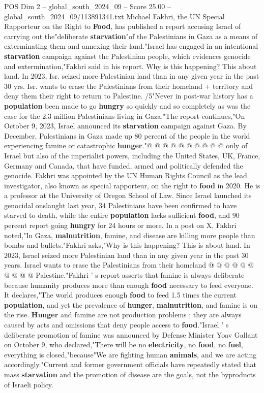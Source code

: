 \begin{textsample}{POS Dim 2 – global\_south\_2024\_09 – Score 25.00 – global\_south\_2024\_09/113891341.txt}  \label{ex:f2_pos_194}
Michael Fakhri, the UN Special Rapporteur on the Right to \textbf{Food}, has published a report accusing Israel of carrying out the"deliberate \textbf{starvation}"of the Palestinians in Gaza as a means of exterminating them and annexing their land."Israel has engaged in an intentional \textbf{starvation} campaign against the Palestinian people, which evidences genocide and extermination,"Fakhri said in his report.
Why is this happening?
This about land.
In 2023, Isr. seized more Palestinian land than in any given year in the past 30 yrs.
Isr. wants to erase the Palestinians from their homeland + territory and deny them their right to return to Palestine. /5"Never in post-war history has a \textbf{population} been made to go \textbf{hungry} so quickly and so completely as was the case for the 2.3 million Palestinians living in Gaza."The report continues,"On October 9, 2023, Israel announced its \textbf{starvation} campaign against Gaza.
By December, Palestinians in Gaza made up 80 percent of the people in the world experiencing famine or catastrophic \textbf{hunger}."@ @ @ @ @ @ @ @ @ @ only of Israel but also of the imperialist powers, including the United States, UK, France, Germany and Canada, that have funded, armed and politically defended the genocide.
Fakhri was appointed by the UN Human Rights Council as the lead investigator, also known as special rapporteur, on the right to \textbf{food} in 2020.
He is a professor at the University of Oregon School of Law.
Since Israel launched its genocidal onslaught last year, 34 Palestinians have been confirmed to have starved to death, while the entire \textbf{population} lacks sufficient \textbf{food}, and 90 percent report going \textbf{hungry} for 24 hours or more.
In a post on X, Fakhri noted,"In Gaza, \textbf{malnutrition}, famine, and disease are killing more people than bombs and bullets."Fakhri asks,"Why is this happening?
This is about land.
In 2023, Israel seized more Palestinian land than in any given year in the past 30 years.
Israel wants to erase the Palestinians from their homeland @ @ @ @ @ @ @ @ @ @ Palestine."Fakhri ' s report asserts that famine is always deliberate because humanity produces more than enough \textbf{food} necessary to feed everyone.
It declares,"The world produces enough \textbf{food} to feed 1.5 times the current \textbf{population}, and yet the prevalence of \textbf{hunger}, \textbf{malnutrition}, and famine is on the rise. \textbf{Hunger} and famine are not production problems ; they are always caused by acts and omissions that deny people access to \textbf{food}."Israel ' s deliberate promotion of famine was announced by Defense Minister Yoav Gallant on October 9, who declared,"There will be no \textbf{electricity}, no \textbf{food}, no \textbf{fuel}, everything is closed,"because"We are fighting human \textbf{animals}, and we are acting accordingly."Current and former government officials have repeatedly stated that mass \textbf{starvation} and the promotion of disease are the goals, not the byproducts of Israeli policy.

\end{textsample}
